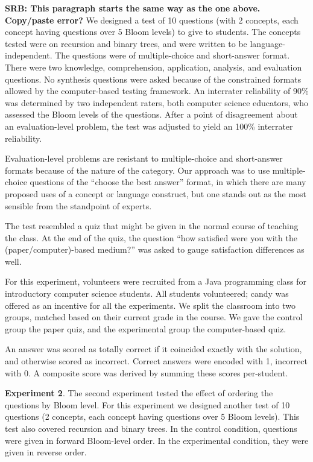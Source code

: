 \documentclass[a4paper,twocolumn]{article}
\begin{document}
{\bf SRB: This paragraph starts the same way as the one above. Copy/paste
error?}
We designed a test of 10 questions (with 2 concepts, each concept having
questions over 5 Bloom levels) to give to students. The concepts tested were on
recursion and binary trees, and were written to be language-independent.  The
questions were of multiple-choice and short-answer format.  There were two
knowledge, comprehension, application, analysis, and evaluation questions.  No
synthesis questions were asked because of the constrained formats allowed by
the computer-based testing framework.  An interrater reliability of 90\% was
determined by two independent raters, both computer science educators, who
assessed the Bloom levels of the questions.  After a point of disagreement
about an evaluation-level problem, the test was adjusted to yield an 100\%
interrater reliability.

Evaluation-level problems are resistant to multiple-choice and short-answer
formats because of the nature of the category.  Our approach was to use
multiple-choice questions of the ``choose the best answer'' format, in which
there are many proposed uses of a concept or language construct, but one stands
out as the most sensible from the standpoint of experts. 

The test resembled a quiz that might be given in the normal course of teaching
the class. At the end of the quiz, the question ``how satisfied were you with
the (paper/computer)-based medium?'' was asked to gauge satisfaction
differences as well.

For this experiment, volunteers were recruited from a Java programming class
for introductory computer science students.  All students volunteered; candy
was offered as an incentive for all the experiments.  We split the classroom
into two groups, matched based on their current grade in the course.  We gave
the control group the paper quiz, and the experimental group the computer-based
quiz.

An answer was scored as totally correct if it coincided exactly with the
solution, and otherwise scored as incorrect. Correct answers were encoded with
1, incorrect with 0.  A composite score was derived by summing these scores
per-student.

\textbf{Experiment 2}.  The second experiment tested the effect of ordering the
questions by Bloom level.  For this experiment we designed another test of 10
questions (2 concepts, each concept having questions over 5 Bloom levels).
This test also covered recursion and binary trees. In the control condition,
questions were given in forward Bloom-level order.  In the experimental
condition, they were given in reverse order.
\end{document}
